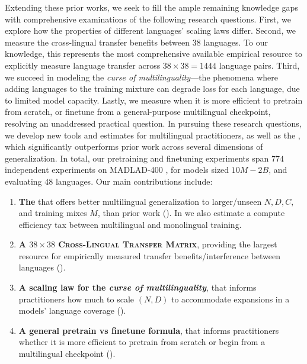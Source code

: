 Extending these prior works, we seek to fill the ample remaining knowledge gaps with comprehensive examinations of the following research questions.
First, we explore how the properties of different languages' scaling laws differ.
Second, we measure the cross-lingual transfer benefits between 38 languages.
To our knowledge, this represents the most comprehensive available empirical resource to explicitly measure language transfer across $38 \times 38 = 1444$ language pairs.
Third, we succeed in modeling the \emph{curse of multilinguality}---the phenomena where adding languages to the training mixture can degrade loss for each language, due to limited model capacity.
Lastly, we measure when it is more efficient to pretrain from scratch, or finetune from a general-purpose multilingual checkpoint, resolving an unaddressed practical question.
In pursuing these research questions, we develop new tools and estimates for multilingual practitioners, as well as the \ourscl{}, which significantly outperforms prior work across several dimensions of generalization.
In total, our pretraining and finetuning experiments span $774$ independent experiments on MADLAD-400 \citep{kudugunta2024madlad}, for models sized $10M-2B$, and evaluating 48 languages.
Our main contributions include:
\begin{enumerate}
    \item \textbf{The \ourscl{}} that offers better multilingual generalization to larger/unseen $N,D,C,$ and training mixes $M$, than prior work (). In  we also estimate a compute efficiency tax between multilingual and monolingual training.
    \item \textbf{A $38 \times 38$ \textsc{Cross-Lingual Transfer Matrix}}, providing the largest resource for empirically measured transfer benefits/interference between languages ().
    \item \textbf{A scaling law for the \emph{curse of multilinguality}}, that informs practitioners how much to scale $(N,D)$ to accommodate expansions in a models' language coverage ().
    \item \textbf{A general pretrain vs finetune formula}, that informs practitioners whether it is more efficient to pretrain from scratch or begin from a multilingual \unimax{} checkpoint ().
\end{enumerate}


